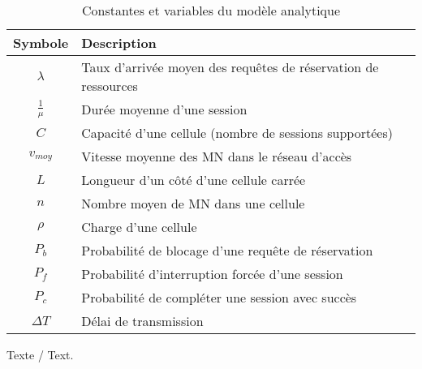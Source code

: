 \label{sec:Theme1}
\begin{table}[htbp]
  \centering
  \caption{Constantes et variables du modèle analytique}
  \begin{tabular}{|c|l|}
    \hline\rowcolor[gray]{0.8}\color{black}
    Symbole         & Description\\\hline
    $\lambda$       & Taux d'arrivée moyen des requêtes de réservation de ressources\\\hline
    $\frac{1}{\mu}$ & Durée moyenne d'une session\\\hline
    $C$             & Capacité d'une cellule (nombre de sessions supportées)\\\hline
    $v_{moy}$       & Vitesse moyenne des MN dans le réseau d'accès\\\hline
    $L$             & Longueur d'un côté d'une cellule carrée\\\hline
    $n$             & Nombre moyen de MN dans une cellule\\\hline
    $\rho$          & Charge d'une cellule\\\hline
    $P_b$           & Probabilité de blocage d'une requête de réservation\\\hline
    $P_f$           & Probabilité d'interruption forcée d'une session\\\hline
    $P_c$           & Probabilité de compléter une session avec succès\\\hline
    $\Delta{}T$     & Délai de transmission\\\hline
  \end{tabular}
  \label{tab:Definitions}
\end{table}
Texte / Text.
